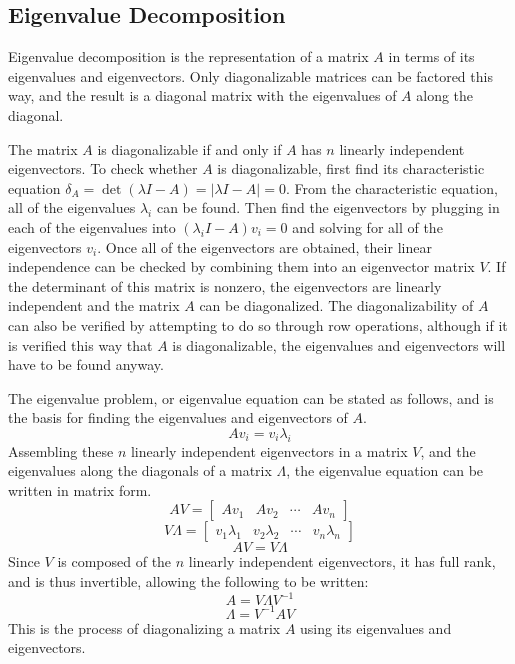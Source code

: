\subsection{Eigenvalue Decomposition}

Eigenvalue decomposition is the representation of a matrix $A$ in terms of its eigenvalues and eigenvectors.
Only diagonalizable matrices can be factored this way, and the result is a diagonal matrix with the eigenvalues of $A$ along the diagonal.

The matrix $A$ is diagonalizable if and only if $A$ has $n$ linearly independent eigenvectors.
 To check whether $A$ is diagonalizable, first find its characteristic equation $\delta_{A}=\det(\lambda I-A)=|\lambda I-A|=0$.
From the characteristic equation, all of the eigenvalues $\lambda_{i}$ can be found.
Then find the eigenvectors by plugging in each of the eigenvalues into $(\lambda_{i} I-A)v_{i}=0$ and solving for all of the eigenvectors $v_{i}$.
Once all of the eigenvectors are obtained, their linear independence can be checked by combining them into an eigenvector matrix $V$.
If the determinant of this matrix is nonzero, the eigenvectors are linearly independent and the matrix $A$ can be diagonalized.
The diagonalizability of $A$ can also be verified by attempting to do so through row operations, although if it is verified this way that $A$ is diagonalizable, the eigenvalues and eigenvectors will have to be found anyway.

The eigenvalue problem, or eigenvalue equation can be stated as follows, and is the basis for finding the eigenvalues and eigenvectors of $A$.
\begin{equation*}
  Av_{i}=v_{i}\lambda_{i}
\end{equation*}
Assembling these $n$ linearly independent eigenvectors in a matrix $V$, and the eigenvalues along the diagonals of a matrix $\Lambda$, the eigenvalue equation can be written in matrix form.
\begin{equation*}
  AV=
  \left[
    \begin{array}{cccc}
      Av_{1} & Av_{2} & \cdots & Av_{n}
    \end{array}
  \right]
\end{equation*}
\begin{equation*}
  V\Lambda=
  \left[
    \begin{array}{cccc}
      v_{1}\lambda_{1} & v_{2}\lambda_{2} & \cdots & v_{n}\lambda_{n}
    \end{array}
  \right]
\end{equation*}
\begin{equation*}
  AV=V\Lambda
\end{equation*}
Since $V$ is composed of the $n$ linearly independent eigenvectors, it has full rank, and is thus invertible, allowing the following to be written:
\begin{equation*}
  A=V\Lambda V^{-1}
\end{equation*}
\begin{equation*}
  \Lambda=V^{-1}AV
\end{equation*}
This is the process of diagonalizing a matrix $A$ using its eigenvalues and eigenvectors.

